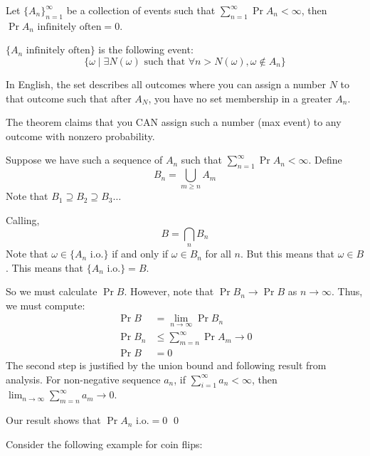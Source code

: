 \begin{theorem} 
    Let $\{A_n\}_{n = 1}^{\infty}$ be a collection of events such that $\sum_{n = 1}^{\infty} \Pr{A_n} < \infty$, then
    $\Pr{A_n \text{ infinitely often}} = 0$.

    $\{A_n \text{ infinitely often}\}$ is the following event:
    \[ \{\omega \mid \exists N(\omega) \text{ such that } \forall n > N(\omega), \omega \not\in A_n \} \]

    In English, the set describes all outcomes where you can assign a number $N$ to that outcome such that
    after $A_N$, you have no set membership in a greater $A_n$.

    The theorem claims that you CAN assign such a number (max event) to any outcome with nonzero probability.

    \begin{proof*}
        Suppose we have such a sequence of $A_n$ such that $\sum_{n = 1}^{\infty} \Pr{A_n} < \infty$.
        Define
        \[ B_n = \bigcup_{m \geq n} A_m \]
        Note that $B_1 \supseteq B_2 \supseteq B_3 \dots$
        
        Calling,
        \[ B = \bigcap_{n} B_n \]
        Note that $\omega \in \{ A_n \text{ i.o.}\}$ if and only if $\omega \in B_n$ for all $n$.
        But this means that $\omega \in B$. This means that $\{ A_n \text{ i.o.}\} = B$.

        So we must calculate $\Pr{B}$. However, note that $\Pr{B_n} \to \Pr{B}$ as $n \to \infty$.
        Thus, we must compute:
        \begin{align*}
            \Pr{B} &= \lim_{n \to \infty} \Pr{B_n} \\
            \Pr{B_n} &\leq \sum_{m = n}^{\infty} \Pr{A_m} \to 0 \\
            \Pr{B} &= 0
        \end{align*}
        The second step is justified by the union bound and following result from analysis. For non-negative sequence $a_n$, if $\sum_{i = 1}^{\infty} a_n < \infty$, then
        $\lim_{n \to \infty} \sum_{m = n}^{\infty} a_m \to 0$.

        Our result shows that $\Pr{A_n \text{ i.o.}} = 0$ \qed
    \end{proof*}
\end{theorem}

Consider the following example for coin flips:

